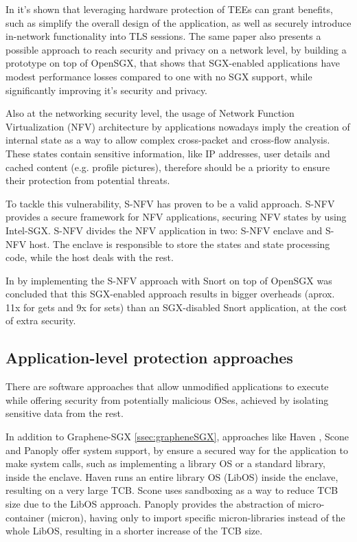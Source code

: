 In \cite{torSGXPaper} it's shown that leveraging hardware protection of TEEs can grant benefits, such as simplify the overall design of the application, as well as securely introduce in-network functionality into TLS sessions. 
The same paper also presents a possible approach to reach security and privacy on a network level, by building a prototype on top of OpenSGX, that shows that SGX-enabled applications have modest performance losses compared to one with no SGX support, while significantly improving it's security and privacy.

Also at the networking security level, the usage of Network Function Virtualization (NFV) architecture by applications nowadays imply the creation of internal state as a way to allow complex cross-packet and cross-flow analysis. These states contain sensitive information, like IP addresses, user details and cached content (e.g. profile pictures), therefore should be a priority to ensure their protection from potential threats. 

To tackle this vulnerability, S-NFV has proven to be a valid approach. 
S-NFV provides a secure framework for NFV applications, securing NFV states by using Intel-SGX. S-NFV divides the NFV application in two: S-NFV enclave and S-NFV host. The enclave is responsible to store the states and state processing code, while the host deals with the rest.

In \cite{sNFVPaper} by implementing the S-NFV approach with Snort \cite{snortPaper} on top of OpenSGX was concluded that this SGX-enabled approach results in bigger overheads (aprox. 11x for gets and 9x for sets) than an SGX-disabled Snort application, at the cost of extra security.



\subsection{Application-level protection approaches}
\label{ssec:sgx_applvl_frameworks}

There are software approaches that allow unmodified applications to execute while offering security from potentially malicious OSes, achieved by isolating sensitive data from the rest. 

In addition to Graphene-SGX \ref{ssec:grapheneSGX}, approaches like Haven \cite{havenPaper}, Scone \cite{sconePaper} and Panoply \cite{panoplyPaper} offer system support, by ensure a secured way for the application to make system calls, such as implementing a library OS or a standard library, inside the enclave. 
Haven runs an entire library OS (LibOS) inside the enclave, resulting on a very large TCB. 
Scone uses sandboxing as a way to reduce TCB size due to the LibOS approach.
Panoply provides the abstraction of micro-container (micron), having only to import specific micron-libraries instead of the whole LibOS, resulting in a shorter increase of the TCB size. 

